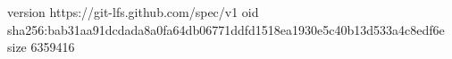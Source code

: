 version https://git-lfs.github.com/spec/v1
oid sha256:bab31aa91dcdada8a0fa64db06771ddfd1518ea1930e5c40b13d533a4c8edf6e
size 6359416
